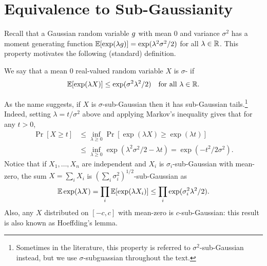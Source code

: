  




\section{Equivalence to Sub-Gaussianity}
\label{sec:bana-subgaussian}
Recall that a Gaussian random variable $g$ with mean $0$ and
variance $\sigma^2$ has a  moment generating function
$ \mathbb{E}[\exp(\lambda g)] = \exp(\lambda^2 \sigma^2/2)$ for all $\lambda
\in \mathbb{R}$. This property motivates the following (standard) definition.

\begin{definition}
We say that a mean $0$ real-valued random variable $X$ is $\sigma$- if  
\[ \mathbb{E}[ \exp(\lambda X)] \leq \exp(\sigma^2 \lambda^2/2) \quad \text{for all $\lambda \in \mathbb{R}$}.\]  
\end{definition}
As the name suggests, if $X$ is $\sigma$-sub-Gaussian then it has sub-Gaussian tails.\footnote{Sometimes in the literature, this property is referred to $\sigma^2$-sub-Gaussian instead, but we use $\sigma$-subguassian throughout the text.} Indeed, setting $\lambda = t/\sigma^2$ above and applying Markov's inequality gives that for any $t>0$,
\begin{align*}\Pr[ X \geq t] &  \le \inf_{\lambda \ge 0} \Pr[\exp(\lambda X)  \geq
  \exp(\lambda t)] \\ 
  & \leq \inf_{\lambda \ge 0} \exp(\lambda^2 \sigma^2/2 - \lambda t) = \exp(-t^2/2\sigma^2).\end{align*}
Notice that if $X_1,\ldots,X_n$ are independent and $X_i$ is $\sigma_i$-sub-Gaussian with mean-zero, the sum $X = \sum_i X_i$ is $\left(\sum_i \sigma_i^2\right)^{1/2}$-sub-Gaussian as
\[ \mathbb{E}\exp(\lambda X) = \prod_i \mathbb{E}[\exp(\lambda X_i)] \leq \prod_i \exp(\sigma_i^2 \lambda^2/2).\]
Also, any $X$ distributed on $[-c,c]$ with mean-zero is
$c$-sub-Gaussian: this result is also known as Hoeffding's lemma.

